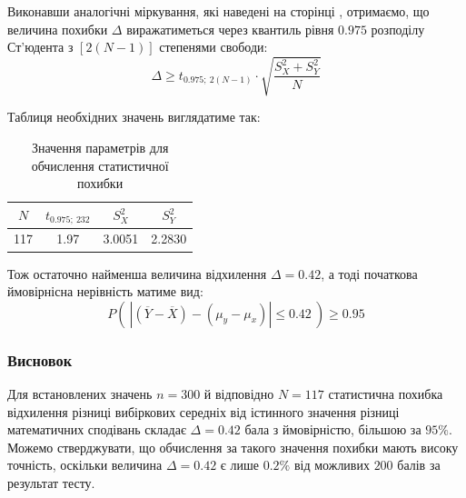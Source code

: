 Виконавши аналогічні міркування, які наведені на сторінці \pageref{page: UKR percentage point}, отримаємо, 
що величина похибки $\Delta$ виражатиметься через квантиль рівня $0.975$ розподілу Ст'юдента з 
$\left[ 2(N-1) \right]$ степенями свободи:
\begin{equation}
    \Delta \geqslant t_{0.975;\ 2(N-1)} \cdot \sqrt{\frac{S_X^2+S_Y^2}{N}}
\end{equation}

Таблиця необхідних значень виглядатиме так:

\vspace{0.8cm}
\begin{table}[H]
    \begin{center}
        \begin{tabular}{||c|c|c|c||}
            \hline
            $N$ & $t_{0.975;\ 232}$ & $S_X^2$ & $S_Y^2$ \\
            \hline \hline
            117 & 1.97 & 3.0051 & 2.2830 \\
            \hline
        \end{tabular}
        \caption{Значення параметрів для обчислення статистичної похибки}
        \label{table: ENG percentage point}
    \end{center}
\end{table}

Тож остаточно найменша величина відхилення $\Delta = 0.42$, а тоді початкова ймовірнісна нерівність матиме вид:
\begin{equation*}
    P\left(\ \left| (\overline{Y}-\overline{X})-(\mu_y-\mu_x) \right| \leqslant 0.42\ \right)\geqslant 0.95
\end{equation*}

\subsubsection{Висновок}

Для встановлених значень $n=300$ й відповідно $N=117$ статистична похибка відхилення різниці вибіркових 
середніх від істинного значення різниці математичних сподівань складає $\Delta = 0.42$ бала з ймовірністю, 
більшою за $95\%$. Можемо стверджувати, що обчислення за такого значення похибки мають високу точність, 
оскільки величина $\Delta = 0.42$ є лише $0.2\%$ від можливих $200$ балів за результат тесту.